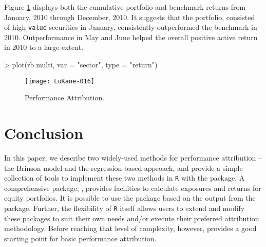Figure \ref{figure:regmultiattrib} displays both the cumulative
portfolio and benchmark returns from January, 2010 through December,
2010. It suggests that the portfolio, consisted of high \texttt{value}
securities in January, consistently outperformed the benchmark in
2010. Outperformance in May and June helped the overall positive
active return in 2010 to a large extent.
\begin{smallverbatim}
> plot(rb.multi, var = "sector", type = "return")
\end{smallverbatim}
\begin{figure}
\centering
\vspace*{.1in}
\texttt{[image: LuKane-016]}
\caption{\label{figure:regmultiattrib}
  Performance Attribution.}
\end{figure}
\section{Conclusion}

In this paper, we describe two widely-used methods for performance
attribution -- the Brinson model and the regression-based approach,
and provide a simple collection of tools to implement these two
methods in \texttt{R} with the  package.  A
comprehensive package,  \citet{kane:david}, provides
facilities to calculate exposures and returns for equity
portfolios. It is possible to use the  package based on the
output from the  package. Further, the flexibility
of \texttt{R} itself allows users to extend and modify these packages
to suit their own needs and/or execute their preferred attribution
methodology. Before reaching that level of complexity, however,
 provides a good starting point for basic performance
attribution.


